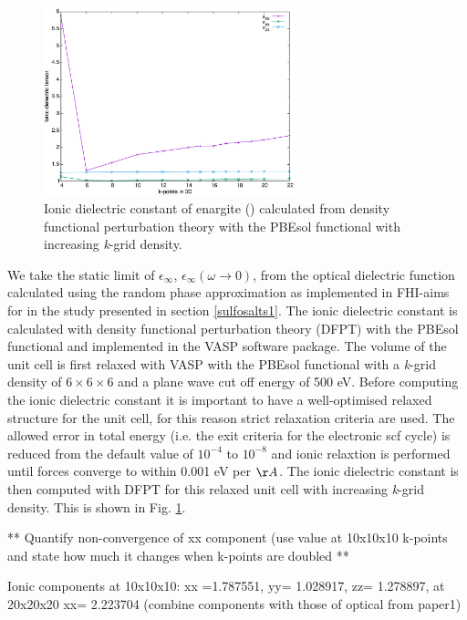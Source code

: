 \documentclass[11pt, twoside]{report}
\begin{document}
\begin{figure}[h!]
    \centering
    \includegraphics[width=0.65\textwidth]{figures/enargite_ionic_dielectric.pdf}
    \caption{Ionic dielectric constant of enargite ({\enargite}) calculated from density functional perturbation theory with the PBEsol functional with increasing \textit{k}-grid density.}
    \label{enargite_ionic_dielectric}
\end{figure}

We take the static limit of $\epsilon_{\infty}$, $\epsilon_{\infty}(\omega \rightarrow 0)$, from the optical dielectric function calculated using the random phase approximation as implemented in FHI-aims for {\enargite} in the study presented in section \ref{sulfosalts1}.
The ionic dielectric constant is calculated with density functional perturbation theory (DFPT) with the PBEsol functional and implemented in the VASP \cite{VASP} software package. The volume of the unit cell is first relaxed with VASP with the PBEsol functional with a \textit{k}-grid density of $6\times6\times6$ and a plane wave cut off energy of 500 eV. Before computing the ionic dielectric constant it is important to have a well-optimised relaxed structure for the unit cell, for this reason strict relaxation criteria are used. The allowed error in total energy (i.e. the exit criteria for the electronic scf cycle) is reduced from the default value of $10^{-4}$ to $10^{-8}$ and ionic relaxtion is performed until forces converge to within 0.001 eV per $\AA$. The ionic dielectric constant is then computed with DFPT for this relaxed unit cell with increasing \textit{k}-grid density. This is shown in Fig. \ref{enargite_ionic_dielectric}.

** Quantify non-convergence of xx component (use value at 10x10x10 k-points and state how much it changes when k-points are doubled **

Ionic components at 10x10x10: xx =1.787551, yy= 1.028917, zz= 1.278897, at 20x20x20 xx= 2.223704 (combine components with those of optical from paper1)
\end{document}
